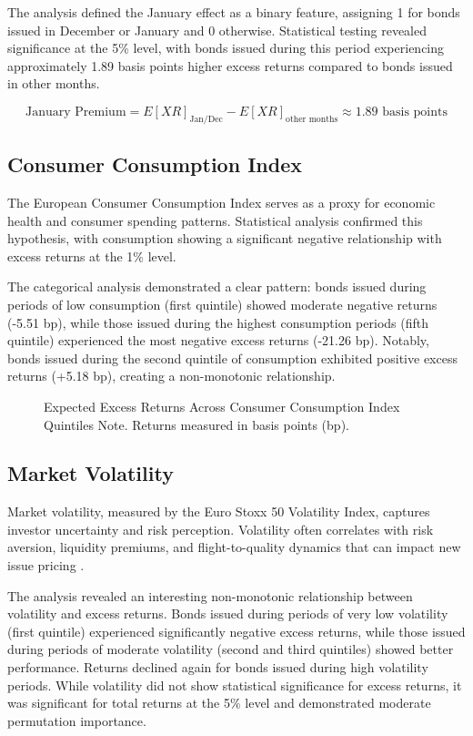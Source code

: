 The analysis defined the January effect as a binary feature, assigning 1 for bonds issued in December or January and 0 otherwise. Statistical testing revealed significance at the 5\% level, with bonds issued during this period experiencing approximately 1.89 basis points higher excess returns compared to bonds issued in other months.

$$\text{January Premium} = E[XR]_{\text{Jan/Dec}} - E[XR]_{\text{other months}} \approx 1.89 \text{ basis points}$$

\subsection{Consumer Consumption Index}

The European Consumer Consumption Index serves as a proxy for economic health and consumer spending patterns. Statistical analysis confirmed this hypothesis, with consumption showing a significant negative relationship with excess returns at the 1\% level.

The categorical analysis demonstrated a clear pattern: bonds issued during periods of low consumption (first quintile) showed moderate negative returns (-5.51 bp), while those issued during the highest consumption periods (fifth quintile) experienced the most negative excess returns (-21.26 bp). Notably, bonds issued during the second quintile of consumption exhibited positive excess returns (+5.18 bp), creating a non-monotonic relationship.

\begin{figure}[h]
    \begin{center}
        
    \end{center}
    \caption{Expected Excess Returns Across Consumer Consumption Index Quintiles Note. Returns measured in basis points (bp).}
    \label{fig:consumption}
\end{figure}

\subsection{Market Volatility}

Market volatility, measured by the Euro Stoxx 50 Volatility Index, captures investor uncertainty and risk perception. Volatility often correlates with risk aversion, liquidity premiums, and flight-to-quality dynamics that can impact new issue pricing \parencite{Thank2004FlightRisk}.

The analysis revealed an interesting non-monotonic relationship between volatility and excess returns. Bonds issued during periods of very low volatility (first quintile) experienced significantly negative excess returns, while those issued during periods of moderate volatility (second and third quintiles) showed better performance. Returns declined again for bonds issued during high volatility periods. While volatility did not show statistical significance for excess returns, it was significant for total returns at the 5\% level and demonstrated moderate permutation importance.

